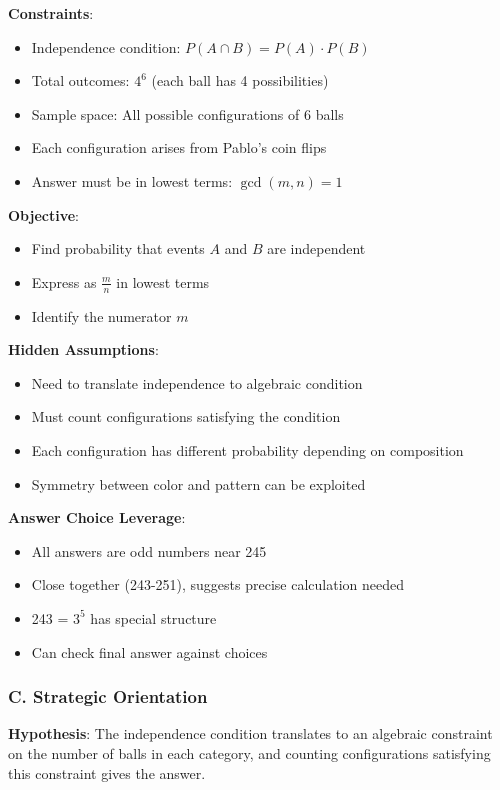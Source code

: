 \documentclass[12pt]{article}
\begin{document}
\begin{problemconfigbox}
\textbf{Constraints}:
\begin{itemize}
    \item Independence condition: $P(A \cap B) = P(A) \cdot P(B)$
    \item Total outcomes: $4^6$ (each ball has 4 possibilities)
    \item Sample space: All possible configurations of 6 balls
    \item Each configuration arises from Pablo's coin flips
    \item Answer must be in lowest terms: $\gcd(m, n) = 1$
\end{itemize}

\textbf{Objective}:
\begin{itemize}
    \item Find probability that events $A$ and $B$ are independent
    \item Express as $\frac{m}{n}$ in lowest terms
    \item Identify the numerator $m$
\end{itemize}

\textbf{Hidden Assumptions}:
\begin{itemize}
    \item Need to translate independence to algebraic condition
    \item Must count configurations satisfying the condition
    \item Each configuration has different probability depending on composition
    \item Symmetry between color and pattern can be exploited
\end{itemize}

\textbf{Answer Choice Leverage}:
\begin{itemize}
    \item All answers are odd numbers near 245
    \item Close together (243-251), suggests precise calculation needed
    \item 243 = $3^5$ has special structure
    \item Can check final answer against choices
\end{itemize}

\subsubsection*{C. Strategic Orientation}

\textbf{Hypothesis}: The independence condition translates to an algebraic constraint on the number of balls in each category, and counting configurations satisfying this constraint gives the answer.


\end{problemconfigbox}
\end{document}
